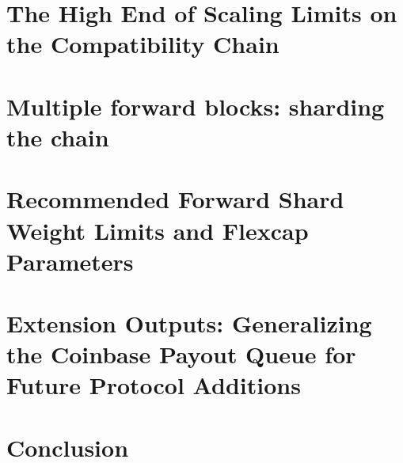 \documentclass[letterpaper, 10 pt, conference]{ieeeconf}
\begin{document}
\section{The High End of Scaling Limits on the Compatibility Chain} \label{hardlimits}


\section{Multiple forward blocks: sharding the chain} \label{sharding}


\section{Recommended Forward Shard Weight Limits and Flexcap Parameters} \label{parameters}


\section{Extension Outputs: Generalizing the Coinbase Payout Queue for Future Protocol Additions} \label{extensionoutputs}


\section{Conclusion} \label{conclusion}





\end{document}
